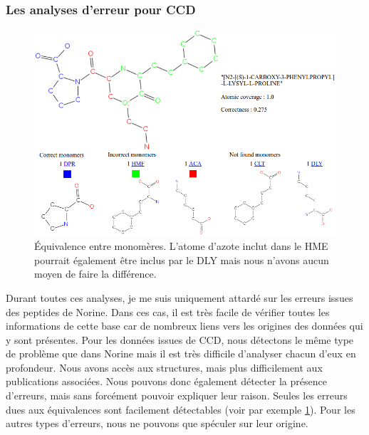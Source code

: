 \subsubsection{Les analyses d'erreur pour CCD}

\begin{figure}[h!]
  \begin{center}
    \includegraphics[width=450px]{Figures/s2m/results/CCD_results.png}
    \caption{\label{CCD_results}Équivalence entre monomères.
    L'atome d'azote inclut dans le HME pourrait également être inclus par le DLY mais nous n'avons aucun moyen de faire la différence.}
  \end{center}
\end{figure}

Durant toutes ces analyses, je me suis uniquement attardé sur les erreurs issues des peptides de Norine.
Dans ces cas, il est très facile de vérifier toutes les informations de cette base car de nombreux liens vers les origines des données qui y sont présentes.
Pour les données issues de CCD, nous détectons le même type de problème que dans Norine mais il est très difficile d'analyser chacun d'eux en profondeur.
Nous avons accès aux structures, mais plus difficilement aux publications associées.
Nous pouvons donc également détecter la présence d'erreurs, mais sans forcément pouvoir expliquer leur raison.
Seules les erreurs dues aux équivalences sont facilement détectables (voir par exemple \ref{CCD_results}).
Pour les autres types d'erreurs, nous ne pouvons que spéculer sur leur origine.




